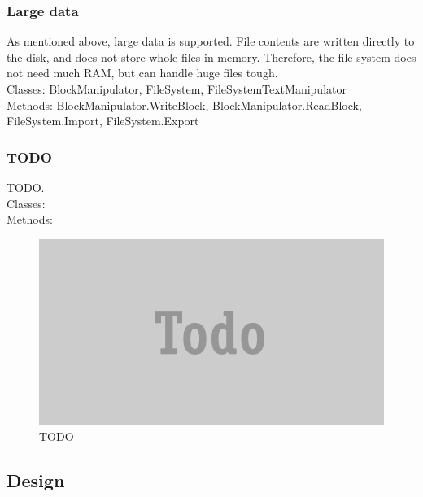 \documentclass[JCDReport.tex]{subfiles}
\begin{document}
\subsubsection{Large data}
As mentioned above, large data is supported. File contents are written directly to the disk, and does not store whole files in memory. Therefore, the file system does not need much RAM, but can handle huge files tough.\\
Classes: BlockManipulator, FileSystem, FileSystemTextManipulator\\
Methods: BlockManipulator.WriteBlock, BlockManipulator.ReadBlock, FileSystem.Import, FileSystem.Export



% 
\subsubsection{TODO}
TODO.\\
Classes:\\
Methods:\\
\begin{figure}[h!]
	\centering
	\includegraphics[scale=1]{Images/todo.png} 
	\caption{TODO}
\end{figure}




\subsection{Design}

\end{document}
